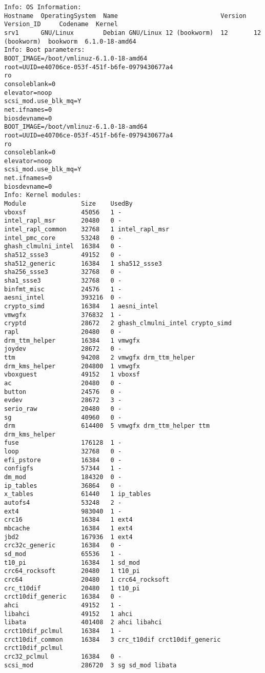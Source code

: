 \begin{longlisting}
\begin{verbatim}
Info: OS Information:
Hostname  OperatingSystem  Name                            Version  Version_ID     Codename  Kernel
srv1      GNU/Linux        Debian GNU/Linux 12 (bookworm)  12       12 (bookworm)  bookworm  6.1.0-18-amd64
Info: Boot parameters:
BOOT_IMAGE=/boot/vmlinuz-6.1.0-18-amd64
root=UUID=e40706ce-053f-451f-b6fe-0979430677a4
ro
consoleblank=0
elevator=noop
scsi_mod.use_blk_mq=Y
net.ifnames=0
biosdevname=0
BOOT_IMAGE=/boot/vmlinuz-6.1.0-18-amd64
root=UUID=e40706ce-053f-451f-b6fe-0979430677a4
ro
consoleblank=0
elevator=noop
scsi_mod.use_blk_mq=Y
net.ifnames=0
biosdevname=0
Info: Kernel modules:
Module               Size    UsedBy
vboxsf               45056   1 -
intel_rapl_msr       20480   0 -
intel_rapl_common    32768   1 intel_rapl_msr
intel_pmc_core       53248   0 -
ghash_clmulni_intel  16384   0 -
sha512_ssse3         49152   0 -
sha512_generic       16384   1 sha512_ssse3
sha256_ssse3         32768   0 -
sha1_ssse3           32768   0 -
binfmt_misc          24576   1 -
aesni_intel          393216  0 -
crypto_simd          16384   1 aesni_intel
vmwgfx               376832  1 -
cryptd               28672   2 ghash_clmulni_intel crypto_simd
rapl                 20480   0 -
drm_ttm_helper       16384   1 vmwgfx
joydev               28672   0 -
ttm                  94208   2 vmwgfx drm_ttm_helper
drm_kms_helper       204800  1 vmwgfx
vboxguest            49152   1 vboxsf
ac                   20480   0 -
button               24576   0 -
evdev                28672   3 -
serio_raw            20480   0 -
sg                   40960   0 -
drm                  614400  5 vmwgfx drm_ttm_helper ttm drm_kms_helper
fuse                 176128  1 -
loop                 32768   0 -
efi_pstore           16384   0 -
configfs             57344   1 -
dm_mod               184320  0 -
ip_tables            36864   0 -
x_tables             61440   1 ip_tables
autofs4              53248   2 -
ext4                 983040  1 -
crc16                16384   1 ext4
mbcache              16384   1 ext4
jbd2                 167936  1 ext4
crc32c_generic       16384   0 -
sd_mod               65536   1 -
t10_pi               16384   1 sd_mod
crc64_rocksoft       20480   1 t10_pi
crc64                20480   1 crc64_rocksoft
crc_t10dif           20480   1 t10_pi
crct10dif_generic    16384   0 -
ahci                 49152   1 -
libahci              49152   1 ahci
libata               401408  2 ahci libahci
crct10dif_pclmul     16384   1 -
crct10dif_common     16384   3 crc_t10dif crct10dif_generic crct10dif_pclmul
crc32_pclmul         16384   0 -
scsi_mod             286720  3 sg sd_mod libata

\end{verbatim}
\end{longlisting}
